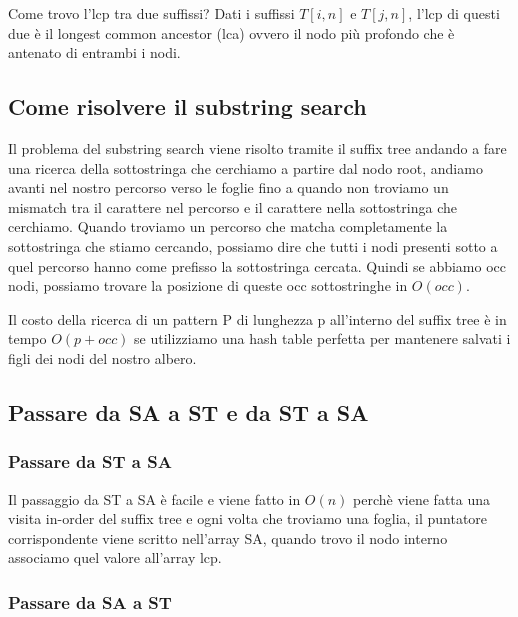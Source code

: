 \documentclass[14pt]{extreport}
\begin{document}
Come trovo l'lcp tra due suffissi? Dati i suffissi $T[i,n]$ e $T[j,n]$, l'lcp di questi due è il longest common ancestor (lca) ovvero il nodo più profondo che è antenato di entrambi i nodi.

\subsection{Come risolvere il substring search}

Il problema del substring search viene risolto tramite il suffix tree andando a fare una ricerca della sottostringa che cerchiamo a partire dal nodo root, andiamo avanti nel nostro percorso verso le foglie fino a quando non troviamo un mismatch tra il carattere nel percorso e il carattere nella sottostringa che cerchiamo.
Quando troviamo un percorso che matcha completamente la sottostringa che stiamo cercando, possiamo dire che tutti i nodi presenti sotto a quel percorso hanno come prefisso la sottostringa cercata. Quindi se abbiamo occ nodi, possiamo trovare la posizione di queste occ sottostringhe in $O(occ)$.

Il costo della ricerca di un pattern P di lunghezza p all'interno del suffix tree è in tempo $O(p+occ)$ se utilizziamo una hash table perfetta per mantenere salvati i figli dei nodi del nostro albero.

\subsection{Passare da SA a ST e da ST a SA}

\subsubsection{Passare da ST a SA}

Il passaggio da ST a SA è facile e viene fatto in $O(n)$ perchè viene fatta una visita in-order del suffix tree e ogni volta che troviamo una foglia, il puntatore corrispondente viene scritto nell'array SA, quando trovo il nodo interno associamo quel valore all'array lcp.


\subsubsection{Passare da SA a ST}
\end{document}
